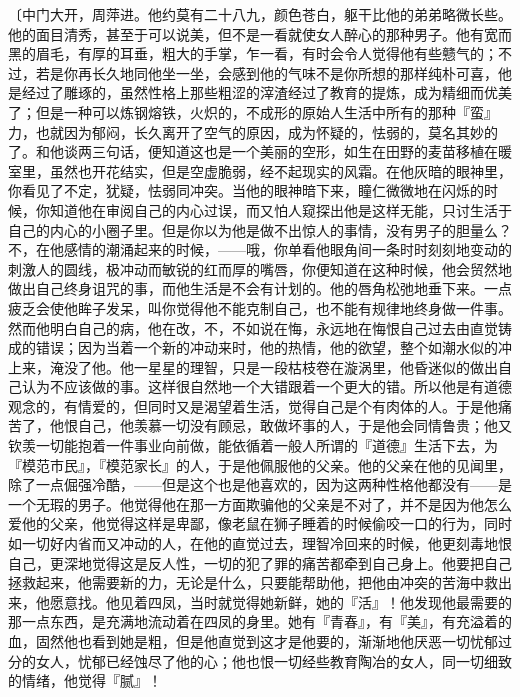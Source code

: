 {\fangsong〔中门大开，周萍进。他约莫有二十八九，颜色苍白，躯干比他的弟弟略微长些。他的面目清秀，甚至于可以说美，但不是一看就使女人醉心的那种男子。他有宽而黑的眉毛，有厚的耳垂，粗大的手掌，乍一看，有时会令人觉得他有些戆气的；不过，若是你再长久地同他坐一坐，会感到他的气味不是你所想的那样纯朴可喜，他是经过了雕琢的，虽然性格上那些粗涩的滓渣经过了教育的提炼，成为精细而优美了；但是一种可以炼钢熔铁，火炽的，不成形的原始人生活中所有的那种『蛮』力，也就因为郁闷，长久离开了空气的原因，成为怀疑的，怯弱的，莫名其妙的了。和他谈两三句话，便知道这也是一个美丽的空形，如生在田野的麦苗移植在暖室里，虽然也开花结实，但是空虚脆弱，经不起现实的风霜。在他灰暗的眼神里，你看见了不定，犹疑，怯弱同冲突。当他的眼神暗下来，瞳仁微微地在闪烁的时候，你知道他在审阅自己的内心过误，而又怕人窥探出他是这样无能，只讨生活于自己的内心的小圈子里。但是你以为他是做不出惊人的事情，没有男子的胆量么？不，在他感情的潮涌起来的时候，——哦，你单看他眼角间一条时时刻刻地变动的刺激人的圆线，极冲动而敏锐的红而厚的嘴唇，你便知道在这种时候，他会贸然地做出自己终身诅咒的事，而他生活是不会有计划的。他的唇角松弛地垂下来。一点疲乏会使他眸子发呆，叫你觉得他不能克制自己，也不能有规律地终身做一件事。然而他明白自己的病，他在改，不，不如说在悔，永远地在悔恨自己过去由直觉铸成的错误；因为当着一个新的冲动来时，他的热情，他的欲望，整个如潮水似的冲上来，淹没了他。他一星星的理智，只是一段枯枝卷在漩涡里，他昏迷似的做出自己认为不应该做的事。这样很自然地一个大错跟着一个更大的错。所以他是有道德观念的，有情爱的，但同时又是渴望着生活，觉得自己是个有肉体的人。于是他痛苦了，他恨自己，他羡慕一切没有顾忌，敢做坏事的人，于是他会同情鲁贵；他又钦羡一切能抱着一件事业向前做，能依循着一般人所谓的『道德』生活下去，为『模范市民』，『模范家长』的人，于是他佩服他的父亲。他的父亲在他的见闻里，除了一点倔强冷酷，——但是这个也是他喜欢的，因为这两种性格他都没有——是一个无瑕的男子。他觉得他在那一方面欺骗他的父亲是不对了，并不是因为他怎么爱他的父亲，他觉得这样是卑鄙，像老鼠在狮子睡着的时候偷咬一口的行为，同时如一切好内省而又冲动的人，在他的直觉过去，理智冷回来的时候，他更刻毒地恨自己，更深地觉得这是反人性，一切的犯了罪的痛苦都牵到自己身上。他要把自己拯救起来，他需要新的力，无论是什么，只要能帮助他，把他由冲突的苦海中救出来，他愿意找。他见着四凤，当时就觉得她新鲜，她的『活』！他发现他最需要的那一点东西，是充满地流动着在四凤的身里。她有『青春』，有『美』，有充溢着的血，固然他也看到她是粗，但是他直觉到这才是他要的，渐渐地他厌恶一切忧郁过分的女人，忧郁已经蚀尽了他的心；他也恨一切经些教育陶冶的女人，同一切细致的情绪，他觉得『腻』！}

